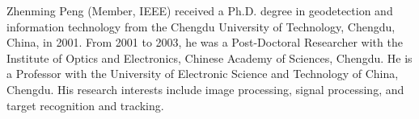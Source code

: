 \documentclass[10pt,journal,compsoc]{IEEEtran}
\begin{document}
\begin{IEEEbiography}
{Zhenming Peng}
(Member, IEEE) received a Ph.D. degree in geodetection and information technology from the Chengdu University of Technology, Chengdu, China, in 2001.
From 2001 to 2003, he was a Post-Doctoral Researcher with the Institute of Optics and Electronics, Chinese Academy of Sciences, Chengdu. He is a Professor with the University of Electronic Science and Technology of China, Chengdu. His research interests include image processing, signal processing, and target recognition and tracking.
\end{IEEEbiography}
\end{document}
